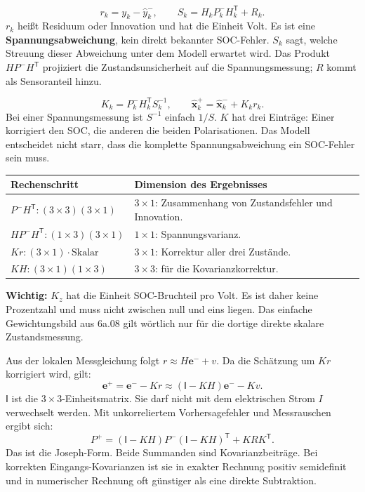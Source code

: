 \[
\boxed{r_k=y_k-\hat y_k^-},\qquad
\boxed{S_k=H_kP_k^-H_k^{\mathsf T}+R_k}.
\]
$r_k$ heißt Residuum oder Innovation und hat die Einheit Volt. Es ist eine \textbf{Spannungsabweichung}, kein direkt bekannter SOC-Fehler. $S_k$ sagt, welche Streuung dieser Abweichung unter dem Modell erwartet wird. Das Produkt $HP^-H^{\mathsf T}$ projiziert die Zustandsunsicherheit auf die Spannungsmessung; $R$ kommt als Sensoranteil hinzu.

\[
\boxed{K_k=P_k^-H_k^{\mathsf T}S_k^{-1}},\qquad
\boxed{\hat{\mathbf x}_k^+=\hat{\mathbf x}_k^-+K_kr_k}.
\]
Bei einer Spannungsmessung ist $S^{-1}$ einfach $1/S$. $K$ hat drei Einträge: Einer korrigiert den SOC, die anderen die beiden Polarisationen. Das Modell entscheidet nicht starr, dass die komplette Spannungsabweichung ein SOC-Fehler sein muss.

\begin{tabular}{p{.41\linewidth}p{.47\linewidth}}
\toprule Rechenschritt & Dimension des Ergebnisses\\\midrule
$P^-H^{\mathsf T}: (3\times3)(3\times1)$ & $3\times1$: Zusammenhang von Zustandsfehler und Innovation.\\
$HP^-H^{\mathsf T}: (1\times3)(3\times1)$ & $1\times1$: Spannungsvarianz.\\
$Kr: (3\times1)\cdot\text{Skalar}$ & $3\times1$: Korrektur aller drei Zustände.\\
$KH: (3\times1)(1\times3)$ & $3\times3$: für die Kovarianzkorrektur.\\\bottomrule
\end{tabular}

\textbf{Wichtig:} $K_z$ hat die Einheit SOC-Bruchteil pro Volt. Es ist daher keine Prozentzahl und muss nicht zwischen null und eins liegen. Das einfache Gewichtungsbild aus 6a.08 gilt wörtlich nur für die dortige direkte skalare Zustandsmessung.

Aus der lokalen Messgleichung folgt $r\approx H\mathbf e^-+v$. Da die Schätzung um $Kr$ korrigiert wird, gilt:
\[
\mathbf e^+=\mathbf e^- -Kr\approx(\mathsf I-KH)\mathbf e^- -Kv.
\]
$\mathsf I$ ist die $3\times3$-Einheitsmatrix. Sie darf nicht mit dem elektrischen Strom $I$ verwechselt werden. Mit unkorreliertem Vorhersagefehler und Messrauschen ergibt sich:
\[
\boxed{P^+=(\mathsf I-KH)P^-(\mathsf I-KH)^{\mathsf T}+KRK^{\mathsf T}.}
\]
Das ist die Joseph-Form. Beide Summanden sind Kovarianzbeiträge. Bei korrekten Eingangs-Kovarianzen ist sie in exakter Rechnung positiv semidefinit und in numerischer Rechnung oft günstiger als eine direkte Subtraktion.

